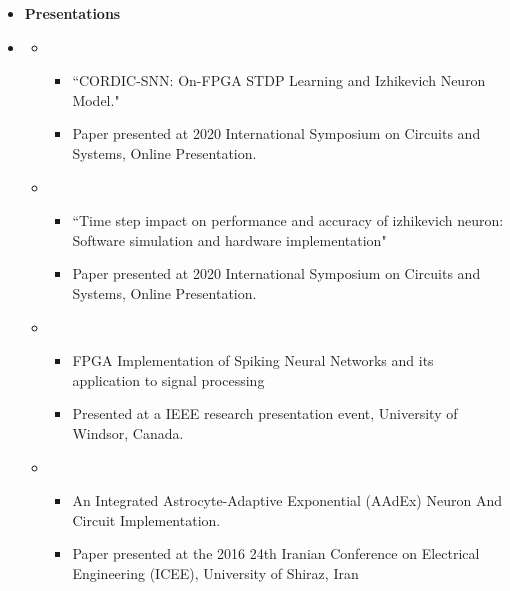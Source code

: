 
\begin {itemize}
    \item [] {\bf \Large    Presentations }  \vspace{-1.5em}
    \item []  {\bf \hrulefill } \mdseries \normalsize 
    \begin {itemize}
        \item []   
        \begin {itemize}
            \item [-] ``CORDIC-SNN: On-FPGA STDP Learning and
            Izhikevich Neuron Model."
            \item [] Paper presented at 2020 International Symposium on Circuits and Systems, Online Presentation.
        \end {itemize}
         \item []   
            \begin {itemize}
                \item [-] ``Time step impact on performance and accuracy of
     izhikevich neuron: Software simulation and hardware implementation"
                \item [] Paper presented at 2020 International Symposium on Circuits and Systems, Online Presentation.
            \end {itemize}
          \item []   
                \begin {itemize}
                    \item [-] FPGA Implementation of Spiking Neural Networks and its application to signal processing
                    \item []  Presented at a IEEE research presentation event, University of Windsor, Canada.
                \end {itemize}
          \item []   
                \begin {itemize}
                    \item [-] An Integrated Astrocyte-Adaptive Exponential (AAdEx) Neuron And Circuit Implementation.
                    \item []  Paper presented at the 2016 24th Iranian Conference on Electrical Engineering (ICEE), University of Shiraz, Iran
                \end {itemize}
        
    \end {itemize}
    
\end {itemize}


